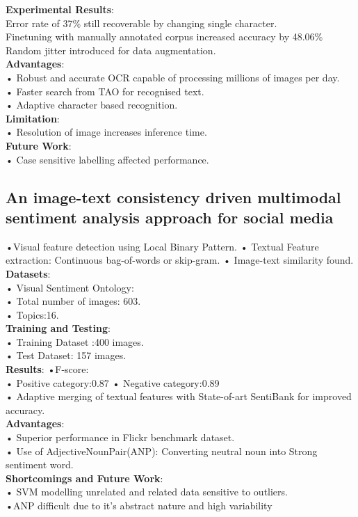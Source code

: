 \documentclass[12pt,a4paper]{article}
\begin{document}
\textbf{Experimental Results}:\\
Error rate of 37\% still recoverable by changing single character.\\
Finetuning with manually annotated corpus increased accuracy by 48.06\%\\
Random jitter introduced for data augmentation.\\
\textbf{Advantages}:\\
• Robust and accurate OCR capable of processing millions of
images per day.\\
• Faster search from TAO for recognised text.\\
• Adaptive character based recognition.\\

\textbf{Limitation}:\\
• Resolution of image increases inference time.\\
\textbf{Future Work}:\\
• Case sensitive labelling affected performance.\\

\subsection{An image-text consistency driven multimodal sentiment analysis approach for social media\cite{imageTextConsistency}}
•Visual feature detection using Local Binary Pattern.
• Textual Feature extraction: Continuous bag-of-words or skip-gram.
• Image-text similarity found.\\
\textbf{Datasets}: \\
• Visual Sentiment Ontology:\\
• Total number of images: 603.\\
• Topics:16.\\
\textbf{Training and Testing}:\\
• Training Dataset :400 images.\\
• Test Dataset: 157 images.\\
\newpage
\textbf{Results}:
•F-score:\\
• Positive
category:0.87
• Negative
category:0.89\\
• Adaptive merging of textual features with State-of-art
SentiBank for improved accuracy.\\
\textbf{Advantages}:\\
• Superior performance in Flickr benchmark dataset.\\
• Use of AdjectiveNounPair(ANP): Converting neutral noun
into Strong sentiment word.
\\\textbf{Shortcomings and Future Work}:\\
 • SVM modelling unrelated and related data sensitive to
outliers.\\
•ANP difficult due to it’s abstract nature and
high variability
\end{document}
